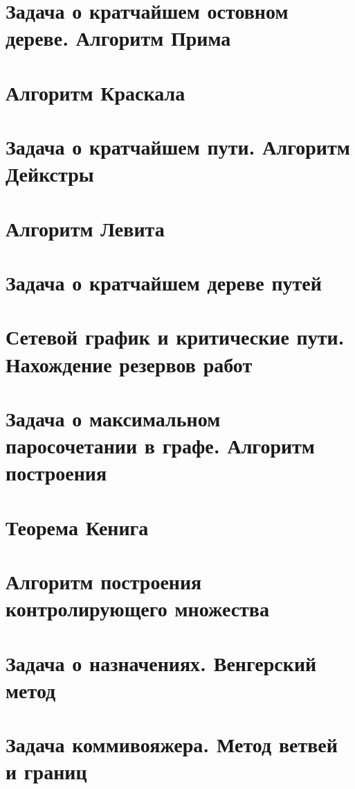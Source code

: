 \documentclass[12pt, fleqn]{article}
\begin{document}
\section{Задача о кратчайшем остовном дереве. Алгоритм Прима}


\section{Алгоритм Краскала}


\section{Задача о кратчайшем пути. Алгоритм Дейкстры}


\section{Алгоритм Левита}


\section{Задача о кратчайшем дереве путей}


\section{Сетевой график и критические пути. Нахождение резервов работ}


\section{Задача о максимальном паросочетании в графе. Алгоритм построения}


\section{Теорема Кенига}


\section{Алгоритм построения контролирующего множества}


\section{Задача о назначениях. Венгерский метод}


\section{Задача коммивояжера. Метод ветвей и границ}
\end{document}

